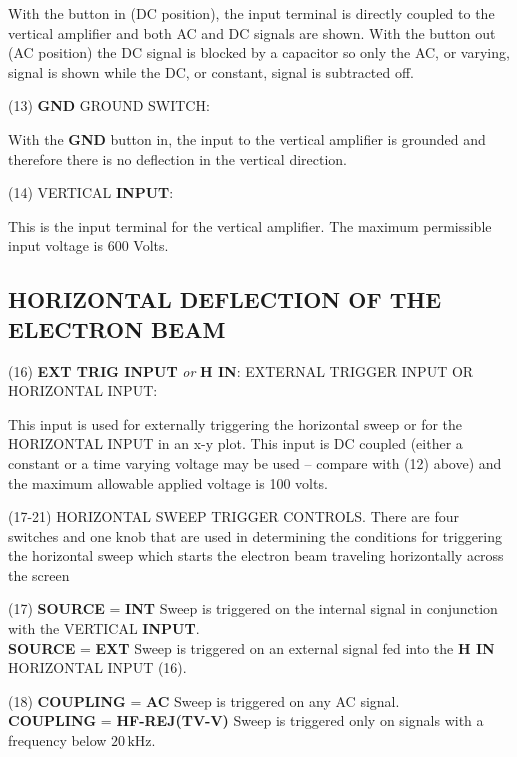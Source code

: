 \indent \indent With the button in (DC position), the input terminal is directly coupled to the vertical amplifier and both AC and DC signals are shown. With the button out (AC position) the DC signal is blocked by a capacitor so only the AC, or varying, signal is shown while the DC, or constant, signal is subtracted off. \myskip

\indent (13) \textbf{GND} GROUND SWITCH:\myskip

\indent \indent With the \textbf{GND} button in, the input to the vertical amplifier is grounded and therefore there is no deflection in the vertical direction.\myskip

\indent (14) VERTICAL \textbf{INPUT}: \myskip

\indent \indent This is the input terminal for the vertical amplifier. The maximum permissible input voltage is 600 Volts.

\subsection{HORIZONTAL DEFLECTION OF THE ELECTRON BEAM}

\indent (16) \textbf{EXT TRIG INPUT} \emph{or} \textbf{H IN}: EXTERNAL TRIGGER INPUT OR HORIZONTAL INPUT: \myskip

\indent \indent This input is used for externally triggering the horizontal sweep or for the HORIZONTAL INPUT in an x-y plot. This input is DC coupled (either a constant or a time varying voltage may be used -- compare with (12) above) and the maximum allowable applied voltage is 100 volts.\myskip

\indent (17-21) HORIZONTAL SWEEP TRIGGER CONTROLS. There are four switches and one knob that are used in determining the conditions for triggering the horizontal sweep which starts the electron beam traveling horizontally across the screen \myskip

\indent \indent (17) \textbf{SOURCE} = \textbf{INT} Sweep is triggered on the internal signal in conjunction with the VERTICAL \textbf{INPUT}. \\
\indent \indent \hspace{1cm}\textbf{SOURCE} = \textbf{EXT} Sweep is triggered on an external signal fed into the \textbf{H IN} HORIZONTAL INPUT (16).\myskip

\indent \indent (18) \textbf{COUPLING} = \textbf{AC} Sweep is triggered on any AC signal. \\
\indent \indent \hspace{1cm} \textbf{COUPLING} = \textbf{HF-REJ(TV-V)} Sweep is triggered only on signals with a frequency below $20\,\mathrm{kHz}$.\myskip

